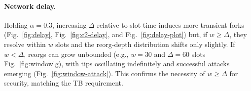 \paragraph{Network delay.}
Holding $\alpha=0.3$, increasing $\Delta$ relative to slot time induces more transient forks (Fig.~\ref{fig:delay}, Fig.~\ref{fig:c2-delay}, and Fig.~\ref{fig:delay-plot}) but, if $w\ge\Delta$, they resolve within $w$ slots and the reorg-depth distribution shifts only slightly. If $w<\Delta$, reorgs can grow unbounded (e.g., $w=30$ and $\Delta=60$ slots Fig.~\ref{fig:window}g), with tips oscillating indefinitely and successful attacks emerging (Fig.~\ref{fig:window-attack}). This confirms the necessity of $w\ge\Delta$ for security, matching the TB requirement.


